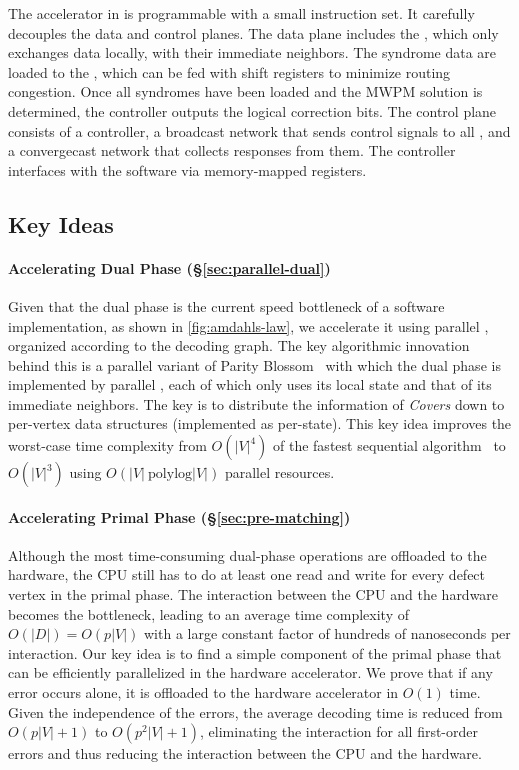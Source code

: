 The accelerator in \arch is programmable with a small instruction set. 
It carefully decouples the data and control planes. 
The data plane includes the \pus, which only exchanges data locally, with their immediate neighbors.
The syndrome data are loaded to the \puvs, which can be fed with shift registers to minimize routing congestion.
Once all syndromes have been loaded and the MWPM solution is determined, the controller outputs the logical correction bits.
The control plane consists of a controller, a broadcast network that sends control signals to all \pus, and a convergecast network that collects responses from them. 
The controller interfaces with the software via memory-mapped registers.

\subsection{Key Ideas}

\paragraph{Accelerating Dual Phase (\S\ref{sec:parallel-dual})}
Given that the dual phase is the current speed bottleneck of a software implementation, as shown in \autoref{fig:amdahls-law}, we accelerate it using parallel \pus, organized according to the decoding graph.
The key algorithmic innovation behind this is a parallel variant of Parity Blossom~\cite{wu2023qce} with which the dual phase is implemented by parallel \pus, each of which only uses its local state and that of its immediate neighbors.
The key is to distribute the information of \emph{Covers} down to per-vertex data structures (implemented as per-\puv state).
This key idea improves the worst-case time complexity from $O(|V|^4)$ of the fastest sequential algorithm~\cite{higgott2025sparse} to $O(|V|^3)$ using $O(|V|\ \text{polylog}|V|)$ parallel resources.

\paragraph{Accelerating Primal Phase (\S\ref{sec:pre-matching})}
Although the most time-consuming dual-phase operations are offloaded to the hardware, the CPU still has to do at least one read and write for every defect vertex in the primal phase.
The interaction between the CPU and the hardware becomes the bottleneck, leading to an average time complexity of $O(|D|) = O(p|V|)$ with a large constant factor of hundreds of nanoseconds per interaction.
Our key idea is to find a simple component of the primal phase that can be efficiently parallelized in the hardware accelerator.
We prove that if any error occurs alone, it is offloaded to the hardware accelerator in $O(1)$ time.
Given the independence of the errors, the average decoding time is reduced from $O(p|V|+1)$ to $O(p^2|V|+1)$, eliminating the interaction for all first-order errors and thus reducing the interaction between the CPU and the hardware.

